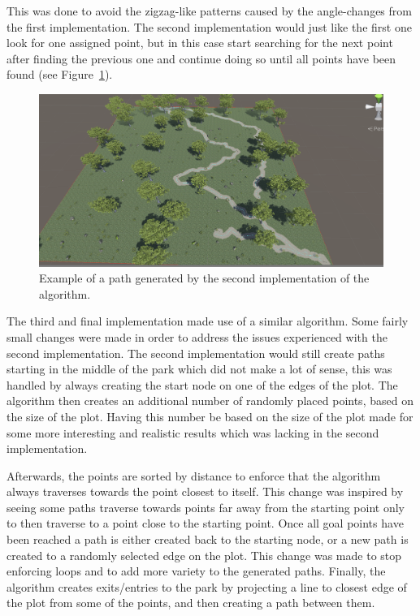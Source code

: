 This was done to avoid the zigzag-like patterns caused by the angle-changes from the first implementation.
The second implementation would just like the first one look for one assigned point, but in this case start searching for the next point after finding the previous one and continue doing so until all points have been found (see Figure~\ref{fig:texsplat}). 
\begin{figure}[H]
\includegraphics[width=\linewidth]{figure/texturesplat}
\caption{Example of a path generated by the second implementation of the algorithm.}
\label{fig:texsplat}
\end{figure}
The third and final implementation made use of a similar algorithm.
Some fairly small changes were made in order to address the issues experienced with the second implementation.
The second implementation would still create paths starting in the middle of the park which did not make a lot of sense, this was handled by always creating the start node on one of the edges of the plot.
The algorithm then creates an additional number of randomly placed points, based on the size of the plot.
Having this number be based on the size of the plot made for some more interesting and realistic results which was lacking in the second implementation.

Afterwards, the points are sorted by distance to enforce that the algorithm always traverses towards the point closest to itself. 
This change was inspired by seeing some paths traverse towards points far away from the starting point only to then traverse to a point close to the starting point.
Once all goal points have been reached a path is either created back to the starting node, or a new path is created to a randomly selected edge on the plot. 
This change was made to stop enforcing loops and to add more variety to the generated paths.
Finally, the algorithm creates exits/entries to the park by projecting a line to closest edge of the plot from some of the points, and then creating a path between them. 
 
